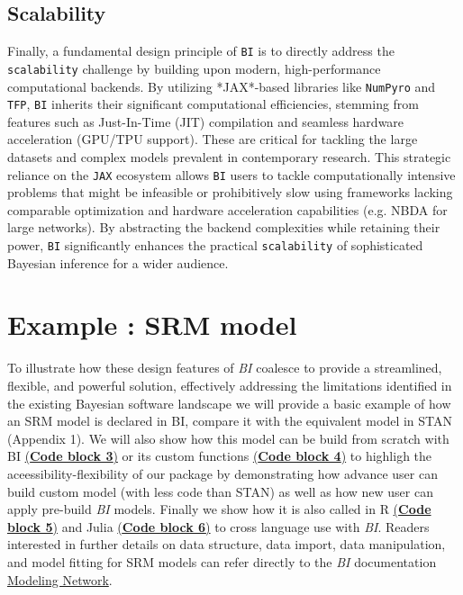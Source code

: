 \documentclass[blind,lineno,num-refs]{wiley-article}
\begin{document}
\subsection{Scalability}\label{Scalability}
 Finally, a fundamental design principle of \texttt{BI} is to directly address the \texttt{scalability} challenge by building upon modern, high-performance computational backends. By utilizing *JAX*-based libraries like \texttt{NumPyro} and \texttt{TFP}, \texttt{BI} inherits their significant computational efficiencies, stemming from features such as Just-In-Time (JIT) compilation and seamless hardware acceleration (GPU/TPU support). These are critical for tackling the large datasets and complex models prevalent in contemporary research. This strategic reliance on the \texttt{JAX} ecosystem allows \texttt{BI} users to tackle computationally intensive problems that might be infeasible or prohibitively slow using frameworks lacking comparable optimization and hardware acceleration capabilities (e.g. NBDA for large networks). By abstracting the backend complexities while retaining their power, \texttt{BI} significantly enhances the practical \texttt{scalability} of sophisticated Bayesian inference for a wider audience.


\section{Example : SRM model}
To illustrate how these design features of \textit{BI} coalesce to provide a streamlined, flexible, and powerful solution, effectively addressing the limitations identified in the existing Bayesian software landscape we will provide a basic example of how an SRM model is declared in BI, compare it with the equivalent model in  STAN (Appendix 1). We will also show how this model can be build from scratch with BI \hyperref[code:block3_example]{(\textbf{Code block 3})} or its custom functions \hyperref[code:block4_example]{(\textbf{Code block 4})} to highligh the aceessibility-flexibility of our package by demonstrating how advance user can build custom model (with less code than STAN) as well as how new user can apply pre-build \textit{BI} models. Finally we show how it is also called in R \hyperref[code:block5_example]{(\textbf{Code block 5})} and Julia \hyperref[code:block6_example]{(\textbf{Code block 6})} to cross language use with \textit{BI}. Readers interested in further details on data structure, data import, data manipulation, and model fitting for SRM models can refer directly to the \textit{BI} documentation \href{https://tinyurl.com/3nrzkrjk}{Modeling Network}.
\end{document}
